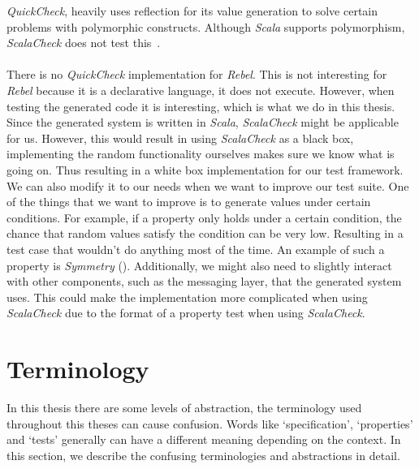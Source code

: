 \textit{QuickCheck}, heavily uses reflection for its value generation to solve
certain problems with polymorphic constructs. Although \textit{Scala} supports
polymorphism, \textit{ScalaCheck} does not test this~\cite{kang2011fortresscheck}.\\
\\
There is no \textit{QuickCheck} implementation for \textit{Rebel}. This is not interesting for \textit{Rebel} because it is a declarative language, it does not execute. However, when testing the generated code it is interesting, which is what we do in this thesis. Since the
generated system is written in \textit{Scala}, \textit{ScalaCheck} might be
applicable for us. However, this would result in using \textit{ScalaCheck} as a
black box, implementing the random functionality ourselves makes sure we know
what is going on. Thus resulting in a white box implementation for our test
framework.%
We can also modify it to our needs when we want to improve our test suite. One
of the things that we want to improve is to generate values under certain
conditions. For example, if a property only holds under a certain condition, the
chance that random values satisfy the condition can be very low. Resulting in a
test case that wouldn't do anything most of the time. An example of such a
property is \textit{Symmetry} (). %
Additionally, we might also need to slightly interact with other components,
such as the messaging layer, that the generated system uses. This could make the
implementation more complicated when using \textit{ScalaCheck} due to the format
of a property test when using \textit{ScalaCheck}.

\section{Terminology}
In this thesis there are some levels of abstraction, the terminology used
throughout this theses can cause confusion. Words like `specification',
`properties' and `tests' generally can have a different meaning depending on the
context. In this section, we describe the confusing terminologies and
abstractions in detail.


